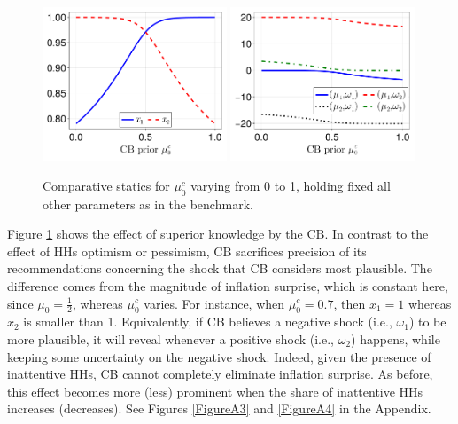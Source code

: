 \documentclass[12pt,a4paper]{article}
\begin{document}
\begin{figure}[H]
\centering
\includegraphics[width=0.49\textwidth]{figures/V11/γ=10.0-μ_0=0.5-α=1.0-θ=1.0/communication/fig_optimal_x_by_μ_0_c.pdf}
\includegraphics[width=0.49\textwidth]{figures/V11/γ=10.0-μ_0=0.5-α=1.0-θ=1.0/communication/fig_optimal_γ_by_μ_0_c.pdf}
\caption{Comparative statics for $\mu_0^c$ varying from 0 to 1, holding fixed all other parameters as in the benchmark.}
\label{Figure2}
\end{figure}

Figure \ref{Figure2} shows the effect of superior knowledge by the CB. In contrast to the effect of HHs optimism or pessimism, CB sacrifices precision of its recommendations concerning the shock that CB considers most plausible. The difference comes from the magnitude of inflation surprise, which is constant here, since $\mu_0=\frac{1}{2}$, whereas $\mu_0^c$ varies. For instance, when $\mu_0^c=0.7$, then $x_1=1$ whereas $x_2$ is smaller than 1. Equivalently, if CB believes a negative shock (i.e., $\omega_1$) to be more plausible, it will reveal whenever a positive shock (i.e., $\omega_2$) happens, while keeping some uncertainty on the negative shock. Indeed, given the presence of inattentive HHs, CB cannot completely eliminate inflation surprise. As before, this effect becomes more (less) prominent when the share of inattentive HHs increases (decreases). See Figures \ref{FigureA3} and \ref{FigureA4} in the Appendix.
\end{document}
